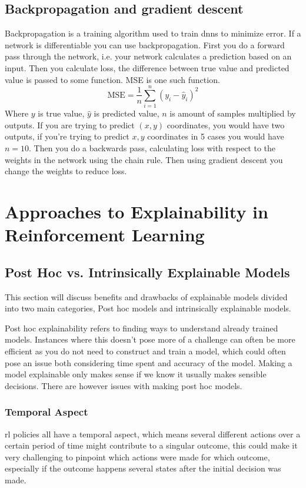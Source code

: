 \documentclass[UKenglish]{uiomasterthesis}
\begin{document}
\subsection{Backpropagation and gradient descent}
Backpropagation is a training algorithm used to train \acp{dnn} to minimize error. If a network is differentiable you can use backpropagation. First you do a forward pass through the network, i.e. your network calculates a prediction based on an input. Then you calculate loss, the difference between true value and predicted value is passed to some function. MSE is one such function.
\[
\text{MSE} = \frac{1}{n} \sum_{i=1}^{n} (y_i - \hat{y}_i)^2
\]
Where $y$ is true value, $\hat{y}$ is predicted value, $n$ is amount of samples multiplied by outputs. If you are trying to predict $(x,y)$ coordinates, you would have two outputs, if you're trying to predict $x,y$ coordinates in 5 cases you would have $n = 10$.
Then you do a backwards pass, calculating loss with respect to the weights in the network using the chain rule. Then using gradient descent you change the weights to reduce loss.


\section{Approaches to Explainability in Reinforcement Learning}
\subsection{Post Hoc vs. Intrinsically Explainable Models}
This section will discuss benefits and drawbacks of explainable models divided into two main categories, Post hoc models and intrinsically explainable models.

Post hoc explainability refers to finding ways to understand already trained models. Instances where this doesn't pose more of a challenge can often be more efficient as you do not need to construct and train a model, which could often pose an issue both considering time spent and accuracy of the model. Making a model explainable only makes sense if we know it usually makes sensible decisions. There are however issues with making post hoc models.

\subsubsection{Temporal Aspect}
\ac{rl} policies all have a temporal aspect, which means several different actions over a certain period of time might contribute to a singular outcome, this could make it very challenging to pinpoint which actions were made for which outcome, especially if the outcome happens several states after the initial decision was made.
\end{document}
